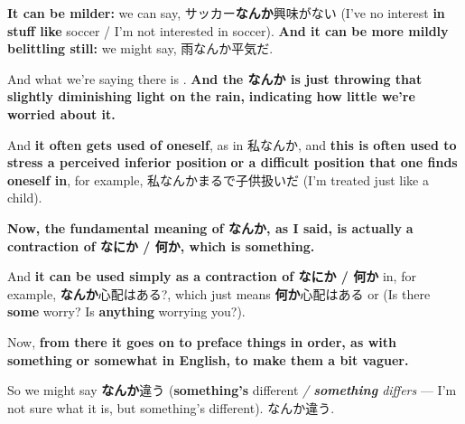 \thinrule

{\bf It can be milder:} we can say, サッカー{\bf なんか}興味がない (I've no interest {\bf in stuff like} soccer / I'm not interested in soccer). {\bf And it can be more mildly belittling still:} we might say, 雨なんか平気だ.

And what we're saying there is . {\bf And the なんか is just throwing that slightly diminishing light on the rain,} {\bf indicating how little we're worried about it.}

\startsectionlevel[title={なんか used with oneself},reference={なんか-used-with-oneself}]

And {\bf it often gets used of oneself}, as in 私なんか, and {\bf this is often used to stress a perceived inferior position} {\bf or a difficult position that one finds oneself in}, for example, 私なんかまるで子供扱いだ (I'm treated just like a child).

\stopsectionlevel

\startsectionlevel[title={なんか - contraction of なにか / 何か},reference={なんか---contraction-of-なにか-何か}]

{\bf Now, the fundamental meaning of なんか, as I said, is actually} {\bf a contraction of なにか / 何か, which is something.}

{}

And {\bf it can be used simply as a contraction of なにか / 何か} in, for example, {\bf なんか}心配はある?, which just means {\bf 何か}心配はある or (Is there {\bf some} worry? Is {\bf anything} worrying you?).

\stopsectionlevel

\startsectionlevel[title={なんか as something, somewhat to make things vaguer},reference={なんか-as-something-somewhat-to-make-things-vaguer}]

Now, {\bf from there it goes on to preface things in order, as with something} {\bf or somewhat in English, to make them a bit vaguer.}

{}

So we might say {\bf なんか}違う ({\bf something's} different {\em / {\bf something} differs} --- I'm not sure what it is, but something's different). なんか違う.

\stopsectionlevel

